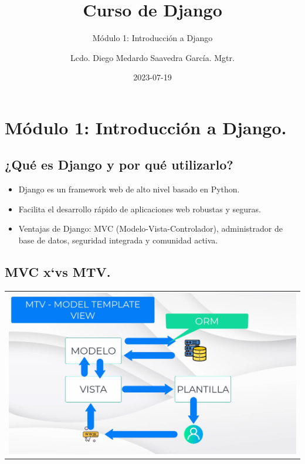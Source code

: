 \documentclass[
  letterpaper,
  DIV=11,
  numbers=noendperiod]{scrartcl}
\title{Curso de Django}
\subtitle{Módulo 1: Introducción a Django}
\author{Lcdo. Diego Medardo Saavedra García. Mgtr.}
\date{2023-07-19}
\providecommand{\tightlist}{%
  \setlength{\itemsep}{0pt}\setlength{\parskip}{0pt}}\usepackage{longtable,booktabs,array}
\renewcommand*\contentsname{Tabla de contenidos}
\newcommand\contentsname{Tabla de contenidos}
\begin{document}
\maketitle
\ifdefined\Shaded\renewenvironment{Shaded}{\begin{tcolorbox}[boxrule=0pt, enhanced, frame hidden, borderline west={3pt}{0pt}{shadecolor}, sharp corners, interior hidden, breakable]}{\end{tcolorbox}}\fi

\renewcommand*\contentsname{Tabla de contenidos}
{
\hypersetup{linkcolor=}
\setcounter{tocdepth}{3}
\tableofcontents
}
\hypertarget{muxf3dulo-1-introducciuxf3n-a-django.}{%
\section{Módulo 1: Introducción a
Django.}\label{muxf3dulo-1-introducciuxf3n-a-django.}}

\hypertarget{quuxe9-es-django-y-por-quuxe9-utilizarlo}{%
\subsection{¿Qué es Django y por qué
utilizarlo?}\label{quuxe9-es-django-y-por-quuxe9-utilizarlo}}

\begin{itemize}
\tightlist
\item
  Django es un framework web de alto nivel basado en Python.
\item
  Facilita el desarrollo rápido de aplicaciones web robustas y seguras.
\item
  Ventajas de Django: MVC (Modelo-Vista-Controlador), administrador de
  base de datos, seguridad integrada y comunidad activa.
\end{itemize}

\hypertarget{mvc-xvs-mtv.}{%
\subsection{MVC x`vs MTV.}\label{mvc-xvs-mtv.}}

\begin{longtable}[]{@{}
  >{\centering\arraybackslash}p{}@{}}
\toprule\noalign{}
\endhead
\bottomrule\noalign{}
\endlastfoot
\includegraphics{images/img001.png} \\
\end{longtable}
\end{document}
